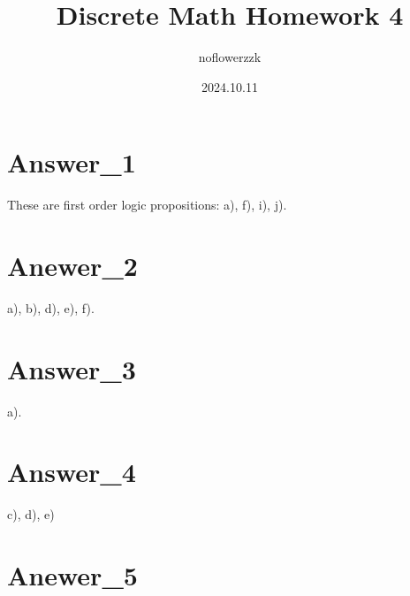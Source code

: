 \documentclass{article}
\title{Discrete Math Homework 4}
\author{noflowerzzk}
\date{2024.10.11}
\begin{document}
\maketitle

\section{Answer\_1}

These are first order logic propositions: a), f), i), j).

\section{Anewer\_2}

a), b), d), e), f).

\section{Answer\_3}

a).

\section{Answer\_4}

c), d), e)

\section{Anewer\_5}
\end{document}

